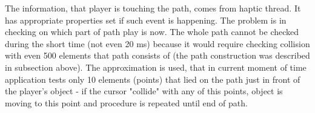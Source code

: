 The information, that player is touching the path, comes from haptic thread. It has appropriate properties set if such event is happening. The problem is in checking on which part of path play is now. The whole path cannot be checked during the short time (not even 20 ms) because it would require checking collision with even 500 elements that path consists of (the path construction was described in subsection above). The approximation is used, that in current moment of time application tests only 10 elements (points) that lied on the path just in front of the player's object - if the cursor "collide" with any of this points, object is moving to this point and procedure is repeated until end of path. 
